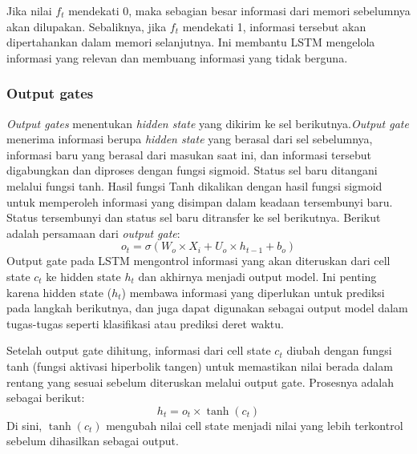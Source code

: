 Jika nilai \( f_t \) mendekati 0, maka sebagian besar informasi dari memori sebelumnya akan dilupakan. Sebaliknya, jika \( f_t \) mendekati 1, informasi tersebut akan dipertahankan dalam memori selanjutnya. Ini membantu LSTM mengelola informasi yang relevan dan membuang informasi yang tidak berguna.
\subsubsection{Output gates}
\emph{Output gates} menentukan \emph{hidden state} yang dikirim ke sel berikutnya.\emph{Output gate} menerima informasi berupa \emph{hidden state} yang berasal dari sel sebelumnya, informasi baru yang berasal dari masukan saat ini, dan informasi tersebut digabungkan dan diproses dengan fungsi sigmoid. Status sel baru ditangani melalui fungsi tanh. Hasil fungsi Tanh dikalikan dengan hasil fungsi sigmoid untuk memperoleh informasi yang disimpan dalam keadaan tersembunyi baru. Status tersembunyi dan status sel baru ditransfer ke sel berikutnya. Berikut adalah persamaan dari \emph{output gate}:
\begin{equation}
  \label{eq:OutputGate}
  o_t = \sigma(W_o \times X_i + U_o \times h_{t-1} + b_o)
\end{equation}
Output gate pada LSTM mengontrol informasi yang akan diteruskan dari cell state \( c_t \) ke hidden state \( h_t \) dan akhirnya menjadi output model. Ini penting karena hidden state (\( h_t \)) membawa informasi yang diperlukan untuk prediksi pada langkah berikutnya, dan juga dapat digunakan sebagai output model dalam tugas-tugas seperti klasifikasi atau prediksi deret waktu.

Setelah output gate dihitung, informasi dari cell state \( c_t \) diubah dengan fungsi tanh (fungsi aktivasi hiperbolik tangen) untuk memastikan nilai berada dalam rentang yang sesuai sebelum diteruskan melalui output gate. Prosesnya adalah sebagai berikut:
\begin{equation}
  \label{eq:OutputGate dari LSTM}
  h_t = o_t \times \tanh(c_t)
\end{equation}
Di sini, \( \tanh(c_t) \) mengubah nilai cell state menjadi nilai yang lebih terkontrol sebelum dihasilkan sebagai output.
